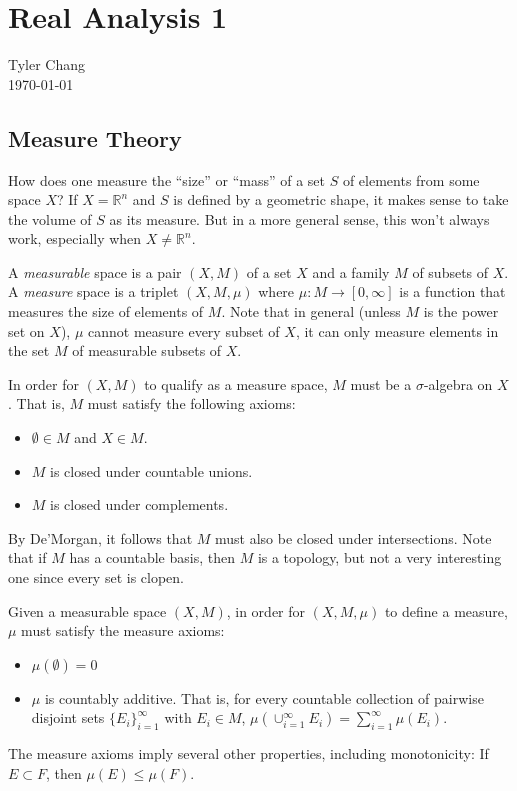 \documentclass[12pt]{article}
\begin{document}
\section*{Real Analysis 1}
Tyler Chang\\
\today

\subsection*{Measure Theory}
 
How does one measure the ``size'' or ``mass'' of a set $S$ of elements from 
some space $X$?
If $X=\mathbb{R}^n$ and $S$ is defined by a geometric shape, it makes sense
to take the volume of $S$ as its measure.
But in a more general sense, this won't always work, especially when 
$X \neq \mathbb{R}^n$.

A {\it measurable} space is a pair $(X,M)$ of a set $X$ and a family $M$ of 
subsets of $X$.
A {\it measure} space is a triplet $(X,M,\mu)$ where 
$\mu : M \rightarrow [0,\infty]$ is a function that measures the size of
elements of $M$.
Note that in general (unless $M$ is the power set on $X$), $\mu$ cannot measure
every subset of $X$, it can only measure elements in the set $M$ of measurable 
subsets of $X$.

In order for $(X,M)$ to qualify as a measure space, $M$ must be a 
$\sigma$-algebra on $X$.
That is, $M$ must satisfy the following axioms:
\begin{itemize}
\item $\emptyset \in M$ and $X \in M$.
\item $M$ is closed under countable unions.
\item $M$ is closed under complements.
\end{itemize}
By De'Morgan, it follows that $M$ must also be closed under intersections.
Note that if $M$ has a countable basis, then $M$ is a topology, but not a
very interesting one since every set is clopen.

Given a measurable space $(X,M)$, in order for $(X,M,\mu)$ to define a 
measure, $\mu$ must satisfy the measure axioms:
\begin{itemize}
\item $\mu(\emptyset) = 0$
\item $\mu$ is countably additive. That is, for every countable collection
of pairwise disjoint sets $\{E_i\}_{i=1}^\infty$ with $E_i \in M$, 
$\mu(\cup_{i=1}^\infty E_i) = \sum_{i=1}^\infty \mu(E_i)$.
\end{itemize}
The measure axioms imply several other properties, including monotonicity: 
If $E \subset F$, then $\mu(E) \leq \mu(F)$.
\end{document}
